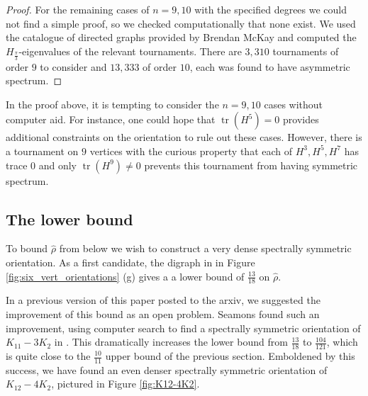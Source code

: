 \documentclass[11pt]{article}
\theoremstyle{plain}
\DeclareMathOperator{\tr}{tr}
\newcommand{\Hs}[0]{H_{\frac{\pi}{3}}}
\begin{document}
\begin{proof}
For the remaining cases of $n=9,10$ with the specified degrees we could not find a simple proof, so we checked computationally that none exist. We used the catalogue of directed graphs provided by Brendan McKay \cite{BMweb} and computed the $\Hs$-eigenvalues of the relevant tournaments. There are $3,310$ tournaments of order $9$ to consider and $13,333$ of order $10$, each was found to have asymmetric spectrum. 
\end{proof}

In the proof above, it is tempting to consider the $n=9,10$ cases without computer aid. For instance, one could hope that $\tr(H^5)=0$ provides additional constraints on the orientation to rule out these cases. However, there is a tournament on $9$ vertices with the curious property that each of $H^3,H^5,H^7$ has trace $0$ and only $\tr(H^9)\neq0$ prevents this tournament from having symmetric spectrum. 



\subsection{The lower bound}

To bound $\hat{\rho}$ from below we wish to construct a very dense spectrally symmetric orientation. As a first candidate, the digraph in in Figure \ref{fig:six_vert_orientations} (g) gives a a lower bound of $\frac{13}{18}$ on $\hat{\rho}$.

In a previous version of this paper posted to the arxiv, we suggested the improvement of this bound as an open problem. Seamons found such an improvement, using computer search to find a spectrally symmetric orientation of $K_{11}-3K_2$ in \cite{JS26}. This dramatically increases the lower bound from $\frac{13}{18}$ to $\frac{104}{121}$, which is quite close to the $\frac{10}{11}$ upper bound of the previous section. Emboldened by this success, we have found an even denser spectrally symmetric orientation of $K_{12}-4K_2$, pictured in Figure \ref{fig:K12-4K2}.
\end{document}
